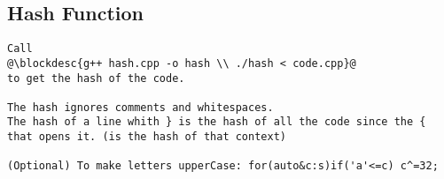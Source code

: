\subsection{Hash Function}
\vspace{-4pt}
\begin{lstlisting}[style=description]
Call
@\blockdesc{g++ hash.cpp -o hash \\ ./hash < code.cpp}@
to get the hash of the code.

The hash ignores comments and whitespaces.
The hash of a line whith } is the hash of all the code since the { that opens it. (is the hash of that context)

(Optional) To make letters upperCase: for(auto&c:s)if('a'<=c) c^=32;

\end{lstlisting}
\vspace{-5pt}
\raggedbottom
\hrulefill


